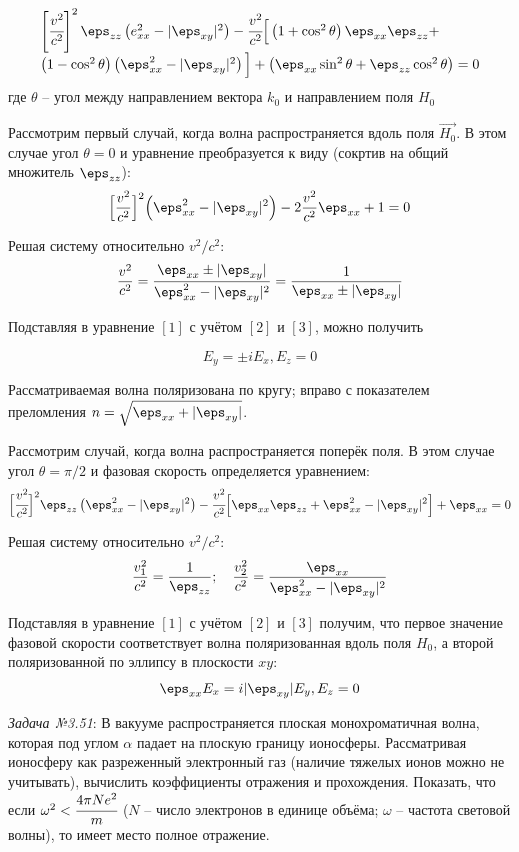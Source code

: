 \[
	\begin{array}{ll}
	\left[\cfrac{v^2}{c^2}\right]^2 \eps_{zz}\left( e^2_{xx} - 
		\vert \eps_{xy} \vert^2 \right) - \cfrac{v^2}{c^2}
		\Big[ \left( 1 + \cos^2\theta \right) \eps_{xx}\eps_{zz} + \\
		\left( 1 - \cos^2\theta \right) \left( \eps^2_{xx} - 
		\vert\eps_{xy}\vert^2 \right)\Big] + \left( \eps_{xx}\sin^2\theta + 
		\eps_{zz}\cos^2\theta \right) = 0
	\end{array}
\]
где \( \theta \) -- угол между направлением вектора \( k_0 \) 
и направлением поля \( H_0 \)

Рассмотрим первый случай, когда волна распространяется вдоль поля 
\( \vec{H_0} \). В этом случае угол \( \theta = 0 \) и уравнение преобразуется 
к виду (сокртив на общий множитель \( \eps_{zz} \)):
\[
	\Big[ \frac{v^2}{c^2} \Big]^2 \Big( \eps^2_{xx} - 
		\vert\eps_{xy}\vert^2 \Big) - 2\frac{v^2}{c^2}\eps_{xx} + 1 = 0
\] 

Решая систему относительно \( v^2 / c^2 \):
\[
	\frac{v^2}{c^2} = \frac{\eps_{xx} \pm \vert \eps_{xy} \vert}
		{\eps^2_{xx} - \vert\eps_{xy}\vert^2} = 
		\frac{1}{\eps_{xx} \pm \vert\eps_{xy}\vert}
\]

Подставляя в уравнение \( [1] \) с учётом \( [2] \) и \( [3] \), можно 
получить 

\[ E_y = \pm i E_x, E_z = 0 \] 

Рассматриваемая волна поляризована по кругу; вправо с показателем преломления 
\( n = \sqrt{\eps_{xx} + \vert\eps_{xy}\vert} \). 

Рассмотрим случай, когда волна распространяется поперёк поля. В этом случае 
угол \( \theta = \pi / 2 \) и фазовая скорость определяется уравнением:
\[
	\Big[ \cfrac{v^2}{c^2} \Big]^2 \eps_{zz}\left( \eps^2_{xx} - 
		\vert\eps_{xy}\vert^2 \right) - \cfrac{v^2}{c^2}
		\Big[ \eps_{xx}\eps_{zz} + \eps^2_{xx} - 
		\vert\eps_{xy}\vert^2\Big] + \eps_{xx} = 0
\]

Решая систему относительно \( v^2 / c^2 \):
\[
	\frac{v^2_1}{c^2} = \frac{1}{\eps_{zz}};\quad
	\frac{v^2_2}{c^2} = \frac{\eps_{xx}}{\eps^2_{xx} - 
		\vert\eps_{xy}\vert^2}
\]

Подставляя в уравнение \( [1] \) с учётом \( [2] \) и \( [3] \) получим, что 
первое значение фазовой скорости соответствует волна поляризованная вдоль 
поля \( H_0 \), а второй поляризованной по эллипсу в плоскости \( xy \):
\[
	\eps_{xx} E_x = i\vert\eps_{xy}\vert E_y, E_z = 0
\]  

\newpage

\emph{Задача №3.51}: В вакууме распространяется плоская монохроматичная 
волна, которая под углом \( \alpha \) падает на плоскую границу ионосферы. 
Рассматривая ионосферу как разреженный электронный газ (наличие тяжелых 
ионов можно не учитывать), вычислить коэффициенты отражения и прохождения. 
Показать, что если \( \omega^2 < \cfrac{4\pi Ne^2}{m} \) (\(N\) -- число 
электронов в единице объёма; \( \omega \) -- частота световой волны), то 
имеет место полное отражение.

